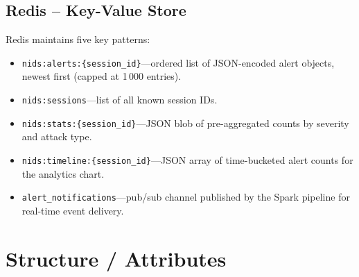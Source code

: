 \documentclass[12pt,a4paper]{report}
\begin{document}
\subsection{Redis -- Key-Value Store}
Redis maintains five key patterns:
\begin{itemize}
  \item \texttt{nids:alerts:\{session\_id\}}---ordered list of JSON-encoded
        alert objects, newest first (capped at 1\,000 entries).
  \item \texttt{nids:sessions}---list of all known session IDs.
  \item \texttt{nids:stats:\{session\_id\}}---JSON blob of pre-aggregated
        counts by severity and attack type.
  \item \texttt{nids:timeline:\{session\_id\}}---JSON array of time-bucketed
        alert counts for the analytics chart.
  \item \texttt{alert\_notifications}---pub/sub channel published by the
        Spark pipeline for real-time event delivery.
\end{itemize}

\section{Structure / Attributes}
\end{document}
